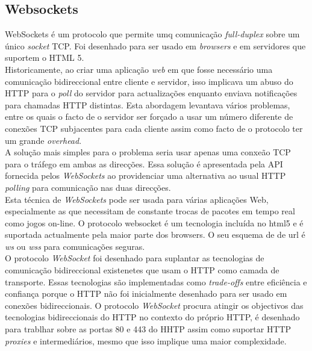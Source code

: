 \subsection{Websockets}
WebSockets é um protocolo que permite umq comunicação \textit{full-duplex} sobre um único \textit{socket} TCP. Foi desenhado para ser usado em \textit{browsers} e em servidores que suportem o HTML 5.\\
Historicamente, ao criar uma aplicação \textit{web} em que fosse necessário uma comunicação bidireccional entre cliente e servidor, isso implicava um abuso do HTTP para o \textit{poll} do servidor para actualizações enquanto enviava notificações para chamadas HTTP distintas. Esta abordagem levantava vários problemas, entre os quais o facto de o servidor ser forçado a usar um número diferente de conexões TCP subjacentes para cada cliente assim como facto de o protocolo ter um grande \textit{overhead}.\\
A solução mais simples para o problema seria usar apenas uma conxeão TCP para o tráfego em ambas as direcções. Essa solução é apresentada pela API fornecida pelos \textit{WebSockets} ao providenciar uma alternativa ao usual HTTP \textit{polling} para comunicação nas duas direcções.\\
Esta técnica de \textit{WebSockets} pode ser usada para várias aplicações Web, especialmente as que necessitam de constante trocas de pacotes em tempo real como jogos on-line. O protocolo websocket é um tecnologia incluída no html5 e é suportada actualmente pela maior parte dos browsers. O seu esquema de de url é \textit{ws} ou \textit{wss} para comunicações seguras. \\
O protocolo \textit{WebSocket} foi desenhado para suplantar as tecnologias de comunicação bidireccional existenetes que usam o HTTP como camada  de transporte. Essas tecnologias são implementadas como \textit{trade-offs} entre eficiência e confiança porque o HTTP não foi inicialmente desenhado para ser usado em conexões bidireccionais. O protocolo \textit{WebSocket} procura atingir os objectivos das tecnologias bidireccionais do HTTP no contexto do próprio HTTP, é desenhado para trablhar sobre as portas 80 e 443 do HHTP assim como suportar HTTP \textit{proxies} e intermediários, mesmo que isso implique uma maior complexidade.\\
